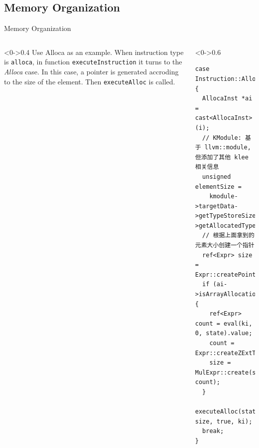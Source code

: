 \documentclass[9pt,aspectratio=43,mathserif,table]{beamer}
\begin{document}
\subsection{Memory Organization}

\begin{frame}[fragile]{Memory Organization}
	\begin{columns}[T]
		\begin{column}<0->{0.4\textwidth}
			Use Alloca as an example.
			When instruction type is \verb|alloca|, in function \verb|executeInstruction| it turns to the \textit{Alloca} case.
			In this case, a pointer is generated accroding to the size of the element. Then \verb|executeAlloc| is called.
		\end{column}
		\hfill
		\begin{column}<0->{0.6\textwidth}
			\begin{lstlisting}
case Instruction::Alloca: {
  AllocaInst *ai = cast<AllocaInst>(i);
  // KModule: 基于 llvm::module, 但添加了其他 klee 相关信息
  unsigned elementSize =  
    kmodule->targetData->getTypeStoreSize(ai->getAllocatedType());
  // 根据上面拿到的元素大小创建一个指针
  ref<Expr> size = Expr::createPointer(elementSize);
  if (ai->isArrayAllocation()) {
    ref<Expr> count = eval(ki, 0, state).value;
    count = Expr::createZExtToPointerWidth(count);
    size = MulExpr::create(size, count);
  }
  executeAlloc(state, size, true, ki);
  break;
}
      \end{lstlisting}
		\end{column}
	\end{columns}
\end{frame}
\end{document}
